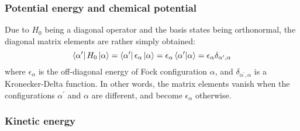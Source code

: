 \documentclass[12pt, two sided]{article}
\begin{document}
\subsubsection{Potential energy and chemical potential}
Due to $H_0$ being a diagonal operator and the basis states being orthonormal, the diagonal matrix elements are rather simply obtained:
%
\begin{equation}
\label{eq:diagonal_elements}
\bra{\alpha^\prime} H_0 \ket{\alpha} =  \bra{\alpha^\prime}  \epsilon_{\alpha} \ket{\alpha}  = \epsilon_{\alpha} \bra{\alpha^\prime} \ket{\alpha} = \epsilon_{\alpha} \delta_{\alpha^\prime,\alpha}
\end{equation}
%
where $\epsilon_{\alpha}$ is the off-diagonal energy of Fock configuration $\alpha$, and $\delta_{\alpha^\prime,\alpha}$ is a Kronecker-Delta function. In other words, the matrix elements vanish when the configurations $\alpha^\prime$ and $\alpha$ are different, and become $\epsilon_{\alpha}$ otherwise.

\subsubsection{Kinetic energy}
\end{document}
